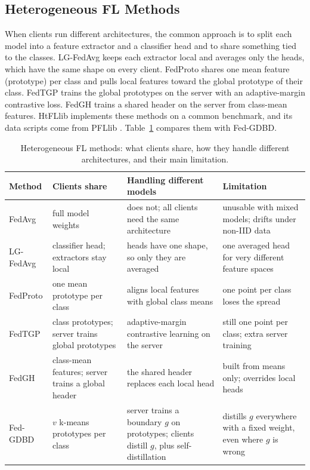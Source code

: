 \documentclass[conference]{IEEEtran}
\begin{document}
\subsection{Heterogeneous FL Methods}
When clients run different architectures, the common approach is to split each model into a feature extractor and a classifier head and to share something tied to the classes. LG-FedAvg \cite{liang2020lgfedavg} keeps each extractor local and averages only the heads, which have the same shape on every client. FedProto \cite{tan2022fedproto} shares one mean feature (prototype) per class and pulls local features toward the global prototype of their class. FedTGP \cite{zhang2024fedtgp} trains the global prototypes on the server with an adaptive-margin contrastive loss. FedGH \cite{yi2023fedgh} trains a shared header on the server from class-mean features. HtFLlib \cite{zhang2025htfllib} implements these methods on a common benchmark, and its data scripts come from PFLlib \cite{zhang2025pfllib}. Table~\ref{tab:lit} compares them with Fed-GDBD.

\begin{table}[t]
\centering
\caption{Heterogeneous FL methods: what clients share, how they handle different architectures, and their main limitation.}
\label{tab:lit}
\footnotesize
\begin{tabularx}{\textwidth}{>{\raggedright\arraybackslash}p{2.3cm}>{\raggedright\arraybackslash}X>{\raggedright\arraybackslash}X>{\raggedright\arraybackslash}X}
\toprule
Method & Clients share & Handling different models & Limitation \\
\midrule
FedAvg \cite{mcmahan2017fedavg} & full model weights & does not; all clients need the same architecture & unusable with mixed models; drifts under non-IID data \\
LG-FedAvg \cite{liang2020lgfedavg} & classifier head; extractors stay local & heads have one shape, so only they are averaged & one averaged head for very different feature spaces \\
FedProto \cite{tan2022fedproto} & one mean prototype per class & aligns local features with global class means & one point per class loses the spread \\
FedTGP \cite{zhang2024fedtgp} & class prototypes; server trains global prototypes & adaptive-margin contrastive learning on the server & still one point per class; extra server training \\
FedGH \cite{yi2023fedgh} & class-mean features; server trains a global header & the shared header replaces each local head & built from means only; overrides local heads \\
Fed-GDBD \cite{zhang2025gdbd} & $v$ k-means prototypes per class & server trains a boundary $g$ on prototypes; clients distill $g$, plus self-distillation & distills $g$ everywhere with a fixed weight, even where $g$ is wrong \\
\bottomrule
\end{tabularx}
\end{table}
\end{document}
